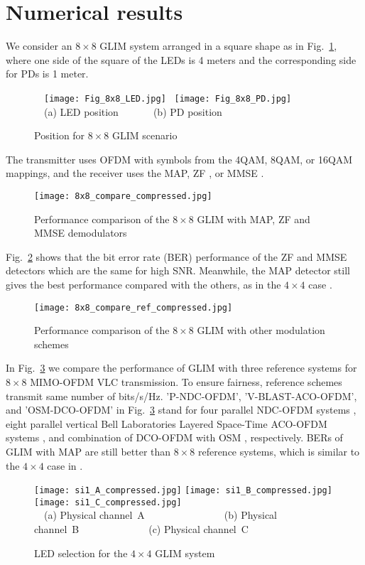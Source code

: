 \documentclass[12pt,letterpaper]{IEEEtran}
\begin{document}
\section{Numerical results}
We consider an $8 \times  8$ GLIM system arranged in a square shape as in Fig.~\ref{Fig:LED_8x8}, where one side of the square of the LEDs is 4 meters and the corresponding side for PDs is 1 meter. 
\begin{figure}[!h] 
	\centering
	~~\texttt{[image: Fig\_8x8\_LED.jpg]}
	~\texttt{[image: Fig\_8x8\_PD.jpg]}\\
	~~(a) LED position~~~~~~~(b) PD position
	\caption{Position for $8 \times 8$ GLIM scenario}
	\label{Fig:LED_8x8}
\end{figure}
The transmitter uses OFDM with symbols from the 4QAM, 8QAM, or 16QAM mappings, and the receiver uses the MAP, ZF \cite{yesilkaya_optical_2017}, or MMSE \cite{tse_fundamentals_2005}.
\begin{figure}[H] 
	\centering
	\texttt{[image: 8x8\_compare\_compressed.jpg]}
	\caption{Performance comparison of the $8\times 8$ GLIM with MAP, ZF and MMSE demodulators}
	\label{Fig:8x8_compare}
\end{figure}
Fig.~\ref{Fig:8x8_compare} shows that the bit error rate (BER) performance of the ZF and MMSE detectors which are the same for high SNR. Meanwhile, the MAP detector still gives the best performance compared with the others, as in the $4 \times  4$ case \cite{yesilkaya_optical_2017}.
\begin{figure}[H] 
	\centering
	\texttt{[image: 8x8\_compare\_ref\_compressed.jpg]}
	\caption{Performance comparison of the $8\times 8$ GLIM with other modulation schemes}
	\label{Fig:8x8_ref}
\end{figure}

In Fig.~\ref{Fig:8x8_ref} we compare the performance of GLIM with three reference systems for $8 \times 8$ MIMO-OFDM VLC transmission. To ensure fairness, reference schemes transmit same number of bits/s/Hz. 'P-NDC-OFDM', 'V-BLAST-ACO-OFDM', and 'OSM-DCO-OFDM' in Fig.~\ref{Fig:8x8_ref} stand for four parallel NDC-OFDM systems \cite{li_non-dc-biased_2013}, eight parallel vertical Bell Laboratories Layered Space-Time ACO-OFDM systems \cite{armstrong_power_2006}, and combination of DCO-OFDM \cite{tan_near-optimal_2016} with OSM \cite{mesleh_optical_2011}, respectively. BERs of GLIM with MAP are still better than $8 \times 8$ reference systems, which is similar to the $4 \times 4$ case in \cite{yesilkaya_optical_2017}.
\begin{figure*}[ht!]
	\centering
	{%
		\texttt{[image: si1\_A\_compressed.jpg]}}\quad
	{%
		\texttt{[image: si1\_B\_compressed.jpg]}}\quad
	{%
		\texttt{[image: si1\_C\_compressed.jpg]}}\\
	~~(a) Physical channel~A~~~~~~~~~~~~~~~~(b) Physical channel~B~~~~~~~~~~~~~~(c)  Physical channel~C
	\caption{LED selection for the $4 \times 4$ GLIM system}
	\label{fig:4x4_selection}
\end{figure*}
\end{document}

